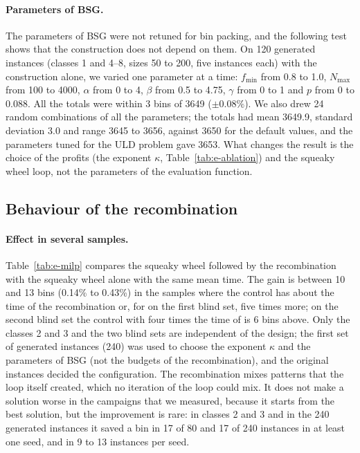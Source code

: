 \paragraph{Parameters of BSG.}
The parameters of BSG were not retuned for bin packing, and the following test shows that the construction does not depend on them. On 120 generated instances (classes 1 and 4--8,
sizes 50 to 200, five instances each) with the construction alone, we varied one parameter at a time: $f_{\min}$ from 0.8 to 1.0, $N_{\max}$ from 100 to 4000, $\alpha$ from 0 to 4, $\beta$
from 0.5 to 4.75, $\gamma$ from 0 to 1 and $p$ from 0 to 0.088. All the totals were within 3 bins of 3649 ($\pm 0.08\%$). We also drew 24 random combinations of all the parameters; the totals
had mean 3649.9, standard deviation 3.0 and range 3645 to 3656, against 3650 for the default values, and the parameters tuned for the ULD problem gave 3653. What changes the result is the choice of the profits (the exponent $\kappa$,
Table~\ref{tab:e-ablation}) and the squeaky wheel loop, not the parameters of the evaluation function.

\subsection{Behaviour of the recombination}
\label{sec:e-recomb}

\paragraph{Effect in several samples.}
Table~\ref{tab:e-milp} compares the squeaky wheel followed by the recombination with the squeaky wheel alone with the same mean time.
The gain is between 10 and 13 bins (0.14\% to 0.43\%) in the samples where the control has about the time of the recombination or, for \cfgfast{} on the first blind set, five times more; on the second blind set the control with four times the time of \cfgfast{} is 6 bins above. Only the classes 2 and 3 and the two blind sets are independent of the design; the
first set of generated instances (240) was used to choose the exponent $\kappa$ and the parameters of BSG (not the budgets of the recombination), and the original
instances decided the configuration. The recombination mixes patterns that the loop itself created, which no iteration of the loop could mix. It does not make a solution worse in the campaigns that we measured, because
it starts from the best solution, but the improvement is rare: in classes 2 and 3 and in the 240 generated instances it saved a bin in 17 of 80 and 17 of 240 instances in at least one seed,
and in 9 to 13 instances per seed.


